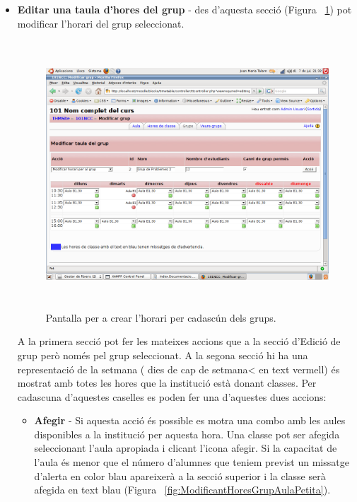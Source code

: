 \documentclass[a4paper]{report}  %
\begin{document}
\begin{itemize}
\item\textbf{Editar una taula d'hores del grup} - des d'aquesta secció (Figura ~\ref{fig:EditantHoresdelgrup}) pot modificar l'horari del grup seleccionat.
		\begin{figure}[H] %
		\begin{center}
		\includegraphics[height=10cm,width=12cm]{img/EditantHoresdelgrup.png}
		\caption[List caption]{Pantalla per a crear l'horari per cadascún dels grups.}
		\label{fig:EditantHoresdelgrup}
		\end{center}
		\end{figure}
A la primera secció pot fer les mateixes accions que a la secció d'Edició de grup però només pel grup seleccionat. A la segona secció hi ha una representació de la setmana ( dies de cap de setmana< en text vermell) és mostrat amb totes les hores que la institució està donant classes. Per cadascuna d'aquestes caselles es poden fer una d'aquestes dues accions:
	\begin{itemize}
	\item\textbf{Afegir} - Si aquesta acció és possible es motra una combo amb les aules disponibles a la institució per aquesta hora.
	Una classe pot ser afegida seleccionant l'aula apropiada i clicant l'icona afegir.
	Si la capacitat de l'aula és menor que el número d'alumnes que teniem previst un missatge d'alerta en color blau apareixerà a la secció superior i la classe serà afegida en text blau (Figura ~\ref{fig:ModificantHoresGrupAulaPetita}).
		\begin{figure}[H] %

\end{figure}
\end{itemize}
\end{itemize}
\end{document}
